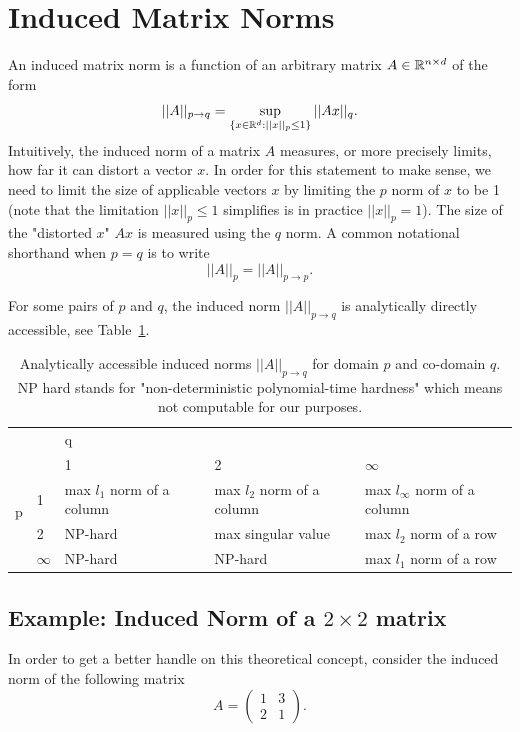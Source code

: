 \documentclass{article}
\begin{document}
\section{Induced Matrix Norms}
An induced matrix norm is a function of an arbitrary matrix $A \in \mathbb{R}^{n \times d}$ of the form
$$||A||_{p \to q} = \sup_{\{x \in \mathbb{R}^d: ||x||_p \leq 1\}} ||Ax||_q.$$
Intuitively, the induced norm of a matrix $A$ measures, or more precisely limits, how far it can distort a vector $x$.
In order for this statement to make sense, we need to limit the size of applicable vectors $x$ by limiting the $p$ norm of $x$ to be 1 (note that the limitation $||x||_p \leq 1$ simplifies is in practice $||x||_p = 1$). 
The size of the "distorted $x$" $Ax$ is measured using the $q$ norm.
A common notational shorthand when $p = q$ is to write
$$||A||_p = ||A||_{p \to p}.$$

For some pairs of $p$ and $q$, the induced norm $||A||_{p \to q}$ is analytically directly accessible, see Table~\ref{tab:induced_norm}. 

\begin{table}[ht]
\caption{Analytically accessible induced norms $||A||_{p \to q}$ for domain $p$ and co-domain $q$. NP hard stands for "non-deterministic polynomial-time hardness" which means not computable for our purposes.}
\begin{tabular}{ll|p{3cm}p{3cm}p{3cm}}
                          & & \multicolumn{3}{l}{\hspace{5cm} q} \\ 
\multirow{4}{*}{p} &                       & 1 & 2  & $\infty$ \\ \cline{2-5}
                          & 1 & max $l_1$ norm of a column & max $l_2$ norm of a column & max $l_\infty$ norm of a column \\
                          & 2                     & NP-hard & max singular value  & max $l_2$ norm of a row \\
                          & $\infty$ & NP-hard & NP-hard & max $l_1$ norm of a row     
\end{tabular}
\label{tab:induced_norm}
\end{table}


\subsection{Example: Induced Norm of a $2 \times 2$ matrix}
In order to get a better handle on this theoretical concept, consider the induced norm of the following matrix 
$$A = 
\begin{pmatrix}
1 & 3 \\
2 & 1
\end{pmatrix}.$$
\end{document}

